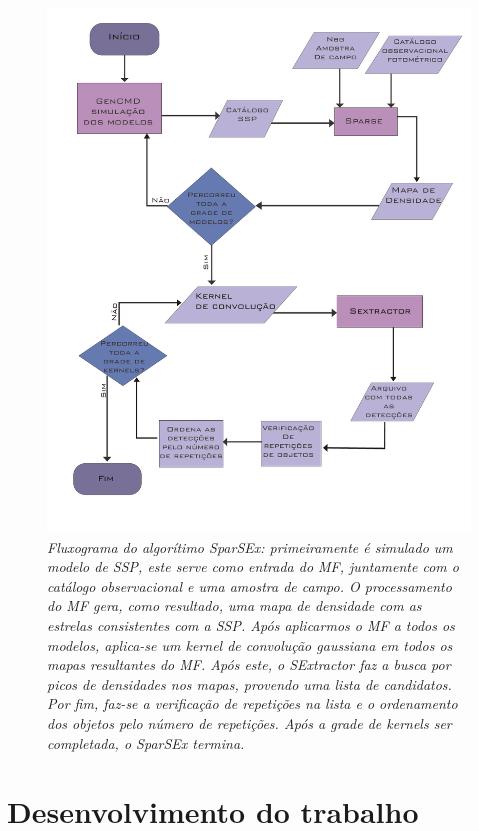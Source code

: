 \documentclass[
	12pt,				%
	openany,			%
	oneside,			%
	a4paper,			%
	english,			%
	brazil				%
	]{abntex2}
\begin{document}
\begin{figure}[h]
\begin{center}
\includegraphics[width=12cm]{figuras/fluxogramaSparsex.pdf}
\caption{\textit{Fluxograma do algorítimo SparSEx: primeiramente é simulado um  modelo de SSP, este serve como entrada do MF, juntamente com o catálogo observacional e uma amostra de campo. O processamento do MF  gera, como resultado, uma mapa de densidade com as estrelas consistentes com a SSP. Após aplicarmos o MF a todos os modelos, aplica-se um kernel de convolução gaussiana em todos os mapas resultantes do MF. Após este, o SExtractor faz a busca por picos de densidades nos mapas, provendo uma lista de candidatos. Por fim, faz-se a verificação de repetições na lista e o ordenamento dos objetos pelo número de repetições. Após a grade de kernels ser completada, o SparSEx termina.}}
\label{fig:fluxo}
\end{center}
\end{figure}
\vspace{0.5cm}

\part{Desenvolvimento do trabalho}
\end{document}
